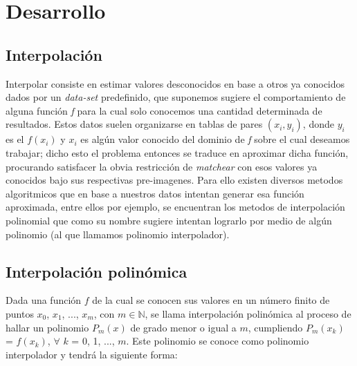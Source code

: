 \section{Desarrollo}

\subsection{Interpolación}

Interpolar consiste en estimar valores desconocidos en base a otros ya conocidos dados por un \textit{data-set} predefinido, que suponemos sugiere el comportamiento de alguna función \textit{f} para la cual solo conocemos una cantidad determinada de resultados. Estos datos suelen organizarse en tablas de pares $(x_i,y_i)$, donde $y_i$ es el $f(x_i)$ y $x_i$ es algún valor conocido del dominio de \textit{f} sobre el cual deseamos trabajar; dicho esto el problema entonces se traduce en aproximar dicha función, procurando satisfacer la obvia restricción de \textit{matchear} con esos valores ya conocidos bajo sus respectivas pre-imagenes. Para ello existen diversos metodos algoritmicos que en base a nuestros datos intentan generar esa función aproximada, entre ellos por ejemplo, se encuentran los metodos de interpolación polinomial que como su nombre sugiere intentan lograrlo por medio de algún polinomio (al que llamamos polinomio interpolador). 



\subsection{Interpolación polinómica}

Dada una función $f$ de la cual se conocen sus valores en un número finito de puntos $x_0$, $x_1$, ..., $x_m$, con $m \in \mathbb{N}$, se llama interpolación polinómica al proceso de hallar un polinomio $P_m(x)$ de grado menor o igual a $m$, cumpliendo $P_m(x_k)$ = $f(x_k)$,  $\forall$ $k$ = 0, 1, ..., $m$.
Este polinomio se conoce como polinomio interpolador y tendrá la siguiente forma:

